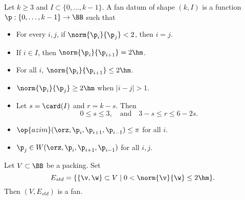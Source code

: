 \begin{definition}
 Let $k\ge3$ and $I\subset
\{0,\ldots,k-1\}$.  A fan datum of shape $(k,I)$ is a function
$\p:\{0,\ldots,k-1\}\to \BB$ such that
\begin{itemize}
\item {} For every $i,j$, if $\norm{\p_i}{\p_j}<2$, then
$i=j$.
\item {} If $i\in I$, then $\norm{\p_i}{\p_{i+1}}=2\hm$.
\item {} For all $i$, $\norm{\p_i}{\p_{i+1}} \le 2\hm$.
\item {}  $\norm{\p_i}{\p_j} \ge 2\hm$ when $|i-j|>1$.
\item {}  Let $s=\card(I)$ and $r=k-s$.  Then 
\begin{displaymath}0\le s \le 3,\quad\text{and}\quad3-s \le r \le 6
- 2s.\end{displaymath}
\item {} $\op{azim}(\orz,\p_i,\p_{i+1},\p_{i-1})\le \pi$ for
all $i$.
\item {} $\p_j\in W(\orz,\p_i,\p_{i+1},\p_{i-1})$ for all $i,j$.
\end{itemize}
\end{definition}

\newpage
\begin{lemma}[]\label{lemma:std-fan}
Let $V\subset \BB$ be a packing.  Set 
\begin{displaymath}E_{std} = \{\{\v,\w\}\subset V\mid 0 <
\norm{\v}{\w} \le 2\hm\}.\end{displaymath} Then $(V,E_{std})$ is a fan.
\end{lemma}
%

